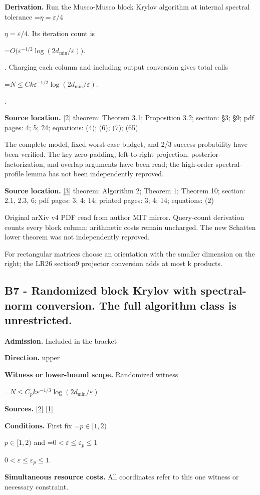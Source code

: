 \documentclass[10pt,a4paper]{article}
\newcommand{\AtlasMath}[1]{\par\begingroup\centering\setbox0=\hbox{$\displaystyle #1$}\ifdim\wd0>1.4\linewidth\typeout{ATLAS WIDE FORMULA: \the\wd0}\fi\ifdim\wd0>\linewidth\resizebox{\linewidth}{!}{\box0}\else\box0\fi\par\endgroup}
\newcommand{\AtlasInlineMath}[1]{\begingroup\setbox0=\hbox{$#1$}\ifdim\wd0>.4\linewidth\endgroup\AtlasMath{#1}\else\endgroup$#1$\fi}
\begin{document}
\textbf{Derivation.} Run the Musco-Musco block Krylov algorithm at internal spectral tolerance \AtlasInlineMath{\eta=\varepsilon/4}. Its iteration count is 
\AtlasMath{O\bigl(\varepsilon^{-1/2}\log(2d_{\mathrm{min}}/\varepsilon)\bigr).}
. Charging each column and including output conversion gives total calls 
\AtlasMath{N\le Ck\varepsilon^{-1/2}\log(2d_{\mathrm{min}}/\varepsilon).}
.

\textbf{Source location.} \href{https://arxiv.org/pdf/2609.35840v2}{[2]} theorem: Theorem 3.1; Proposition 3.2; section: §3; §9; pdf pages: 4; 5; 24; equations: (4); (6); (7); (65)

The complete model, fixed worst-case budget, and 2/3 success probability have been verified. The key zero-padding, left-to-right projection, posterior-factorization, and overlap arguments have been read; the high-order spectral-profile lemma has not been independently reproved.

\textbf{Source location.} \href{https://arxiv.org/pdf/1504.05477v4}{[3]} theorem: Algorithm 2; Theorem 1; Theorem 10; section: 2.1, 2.3, 6; pdf pages: 3; 4; 14; printed pages: 3; 4; 14; equations: (2)

Original arXiv v4 PDF read from author MIT mirror. Query-count derivation counts every block column; arithmetic costs remain uncharged. The new Schatten lower theorem was not independently reproved.

For rectangular matrices choose an orientation with the smaller dimension on the right; the LR26 section9 projector conversion adds at most k products.

\subsection{B7 - Randomized block Krylov with spectral-norm conversion. The full algorithm class is unrestricted.}
\textbf{Admission.} Included in the bracket

\textbf{Direction.} upper

\textbf{Witness or lower-bound scope.} Randomized witness

\AtlasMath{N\le C_p k\varepsilon^{-1/3}\log(2d_{\mathrm{min}}/\varepsilon)}
\textbf{Sources.} \href{https://arxiv.org/pdf/2609.35840v2}{[2]} \href{https://arxiv.org/pdf/2202.05120v4}{[1]}

\textbf{Conditions.} First fix \AtlasInlineMath{p\in[1,2)} and \AtlasInlineMath{0<\varepsilon\le\varepsilon_p\le1}.

\textbf{Simultaneous resource costs.} All coordinates refer to this one witness or necessary constraint.
\end{document}
